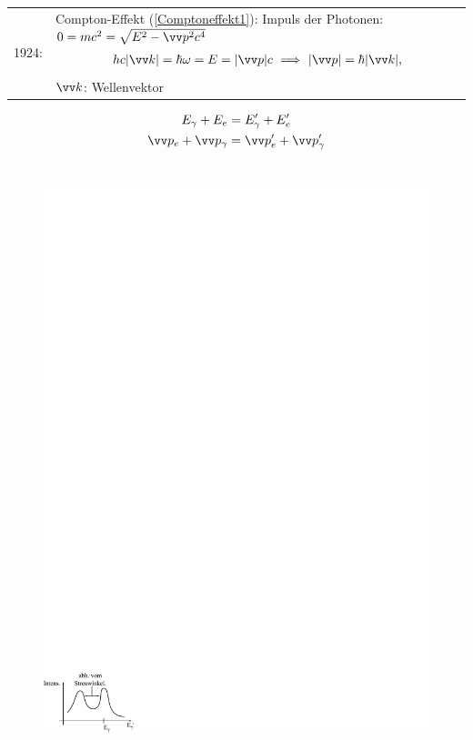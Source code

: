\documentclass[a4paper]{scrartcl}
\begin{document}
\begin{tabular}{l p{400pt}}
1924: &
Compton-Effekt (\ref{Comptoneffekt1}): Impuls der Photonen: $0 = mc^2 = \sqrt{ E^2 - \vv p^2 c^4 }$
\begin{align}
h c \vert \vv k \vert = \hbar \omega = E = \vert \vv p \vert c \ \Longrightarrow \ \vert \vv p \vert = \hbar \vert\vv k \vert,
\end{align}
$\vv k$: Wellenvektor
\end{tabular}
\begin{align*}
E_\gamma + E_e & = E_\gamma' + E_e' \\
\vv p_e + \vv p_\gamma & = \vv p_e' + \vv p_\gamma'
\end{align*}
\\
\begin{figure}[h]
\centering
\includegraphics{002Intensitat} 
\label{002Intensitat}
\end{figure}
\end{document}
